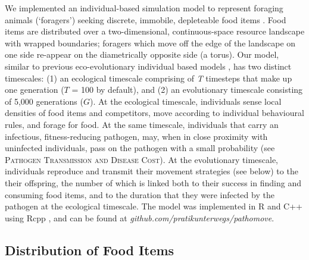 We implemented an individual-based simulation model to represent foraging animals (`foragers') seeking discrete, immobile, depleteable food items \citep[as in][]{spiegel2017,gupte2021a}.
Food items are distributed over a two-dimensional, continuous-space resource landscape with wrapped boundaries; foragers which move off the edge of the landscape on one side re-appear on the diametrically opposite side (a torus).
Our model, similar to previous eco-evolutionary individual based models \citep{getz2015, netz2021a, gupte2021a}, has two distinct timescales: (1) an ecological timescale comprising of \textit{T} timesteps that make up one generation ($T$ = 100 by default), and (2) an evolutionary timescale consisting of 5,000 generations ($G$).
At the ecological timescale, individuals sense local densities of food items and competitors, move according to individual behavioural rules, and forage for food.
At the same timescale, individuals that carry an infectious, fitness-reducing pathogen, may, when in close proximity with uninfected individuals, pass on the pathogen with a small probability (see \textsc{Pathogen Transmission and Disease Cost}).
At the evolutionary timescale, individuals reproduce and transmit their movement strategies (see below) to the their offspring, the number of which is linked both to their success in finding and consuming food items, and to the duration that they were infected by the pathogen at the ecological timescale.
The model was implemented in R and C++ using Rcpp \citep{rcoreteam2020,eddelbuettel2013}, and can be found at \textit{github.com/pratikunterwegs/pathomove}.

\subsection*{Distribution of Food Items}


